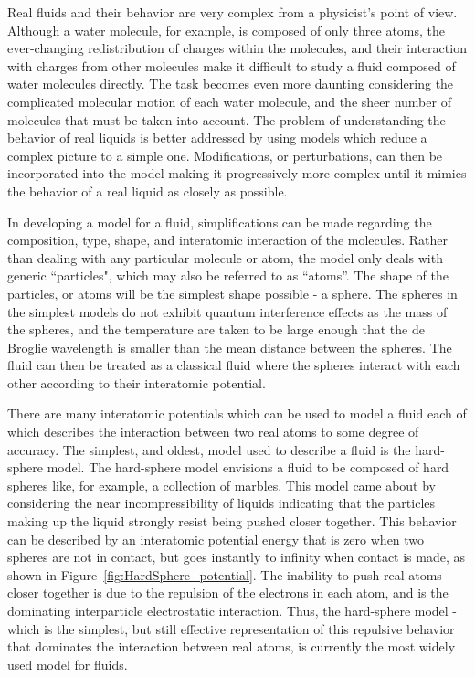 \documentclass[double,12pt]{beavtex}
\begin{document}
Real fluids and their behavior are very complex from a physicist's point 
of view. Although a water molecule, for example, is composed of only three
atoms, the ever-changing redistribution of charges within the molecules, 
and their interaction with charges from other molecules make it difficult 
to study a fluid composed of water molecules directly. The task becomes 
even more daunting considering the complicated molecular motion of each 
water molecule, and the sheer number of molecules that must be taken 
into account. 
The problem of understanding the behavior of real liquids is better addressed 
by using models which reduce a complex picture to a simple one. Modifications, 
or perturbations, can then be incorporated into the model making it 
progressively more complex until it mimics the behavior of a real 
liquid as closely as possible.

In developing a model for a fluid, simplifications can be made regarding 
the composition, type, shape, and interatomic interaction of the molecules. 
Rather than dealing with any particular molecule or atom, the model only 
deals with generic ``particles", which may also be referred to as ``atoms''. 
The shape of the particles, or atoms will be the simplest shape possible - 
a sphere. The spheres in the simplest models do not exhibit quantum 
interference effects as the mass of the spheres, and the temperature 
are taken to be large enough that the de Broglie wavelength is smaller 
than the mean distance between the spheres. The fluid can then be treated 
as a classical fluid where the spheres interact with each other according 
to their interatomic potential. 

There are many interatomic potentials which can be used to model a fluid 
each of which describes the interaction between two real atoms to some 
degree of accuracy. The simplest, and oldest, model used to describe a 
fluid is the hard-sphere model. The hard-sphere model envisions a fluid 
to be composed of hard spheres like, for example, a collection of marbles. 
This model came about by considering the near incompressibility of liquids 
indicating that the particles making up the liquid strongly resist being 
pushed closer together. This behavior can be described by an interatomic 
potential energy that is zero when two spheres are not in contact, but 
goes instantly to infinity when contact is made, as shown in 
Figure~\ref{fig:HardSphere_potential}. The inability to push 
real atoms closer together is due to the repulsion of the electrons in 
each atom, and is the dominating interparticle electrostatic interaction. 
Thus, the hard-sphere model - which is the simplest, but still effective 
representation of this repulsive behavior that dominates the interaction 
between real atoms, is currently the most widely used model for fluids.
\end{document}
